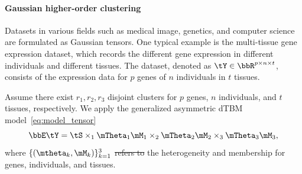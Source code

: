 \documentclass[lettersize,onecolumn,journal]{IEEEtran}
\theoremstyle{definition}
\theoremstyle{definition}
\newtheorem{example}{Example}
\providecommand{\DIFaddtex}[1]{{\protect\color{blue}\uwave{#1}}} %
\providecommand{\DIFdeltex}[1]{{\protect\color{red}\sout{#1}}}                      %
\providecommand{\DIFaddbegin}{} %
\providecommand{\DIFaddend}{} %
\providecommand{\DIFdelbegin}{} %
\providecommand{\DIFdelend}{} %
\providecommand{\DIFadd}[1]{\texorpdfstring{\DIFaddtex{#1}}{#1}} %
\providecommand{\DIFdel}[1]{\texorpdfstring{\DIFdeltex{#1}}{}} %
\newcommand{\DIFscaledelfig}{0.5}
\newlength{\DIFdelgraphicswidth} %
\newlength{\DIFdelgraphicsheight} %
\newcommand{\DIFaddincludegraphics}[2][]{{\color{blue}\fbox{\DIFOincludegraphics[#1]{#2}}}} %
\newcommand{\DIFdelincludegraphics}[2][]{%
\sbox{\DIFdelgraphicsbox}{\DIFOincludegraphics[#1]{#2}}%
\settoboxwidth{\DIFdelgraphicswidth}{\DIFdelgraphicsbox} %
\settoboxtotalheight{\DIFdelgraphicsheight}{\DIFdelgraphicsbox} %
\scalebox{\DIFscaledelfig}{%
\parbox[b]{\DIFdelgraphicswidth}{\usebox{\DIFdelgraphicsbox}\\[-\baselineskip] \rule{\DIFdelgraphicswidth}{0em}}\llap{\resizebox{\DIFdelgraphicswidth}{\DIFdelgraphicsheight}{%
\setlength{\unitlength}{\DIFdelgraphicswidth}%
\begin{picture}(1,1)%
\thicklines\linethickness{2pt} %
{\color[rgb]{1,0,0}\put(0,0){\framebox(1,1){}}}%
{\color[rgb]{1,0,0}\put(0,0){\line( 1,1){1}}}%
{\color[rgb]{1,0,0}\put(0,1){\line(1,-1){1}}}%
\end{picture}%
}\hspace*{3pt}}} %
} %
\DeclareRobustCommand{\DIFaddbegin}{\DIFOaddbegin \let\includegraphics\DIFaddincludegraphics} %
\DeclareRobustCommand{\DIFaddend}{\DIFOaddend \let\includegraphics\DIFOincludegraphics} %
\DeclareRobustCommand{\DIFdelbegin}{\DIFOdelbegin \let\includegraphics\DIFdelincludegraphics} %
\DeclareRobustCommand{\DIFdelend}{\DIFOaddend \let\includegraphics\DIFOincludegraphics} %
\begin{document}
\paragraph{Gaussian higher-order clustering} Datasets in various fields such as medical image, genetics, and computer science are formulated as Gaussian tensors. One typical example is the multi-tissue gene expression dataset, which records the different gene expression in different individuals and different tissues. The dataset, denoted as $\tY \in \bbR^{p \times n \times t}$, consists of the expression data for $p$ genes of $n$ individuals in $t$ tissues. 

Assume there exist $r_1, r_2, r_3$ disjoint clusters for $p$ genes, $n$ individuals, and $t$ tissues, respectively. We apply the generalized asymmetric dTBM model~\eqref{eq:model_tensor} 
\DIFdelbegin %
\DIFdelend \DIFaddbegin \begin{equation}
    \bbE\tY = \tS \times_1 \mTheta_1 \mM_1 \times_2 \mTheta_2 \mM_2 \times_3 \mTheta_3 \mM_3, 
\end{equation}\DIFaddend 
where $\{(\mtheta_k, \mM_k)\}_{k=1}^3$ \DIFdelbegin \DIFdel{refers to }\DIFdelend \DIFaddbegin \DIFadd{represents }\DIFaddend the heterogeneity and membership for genes, individuals, and tissues. \DIFaddbegin \\
\DIFaddend 


\DIFdelbegin %

\end{document}
